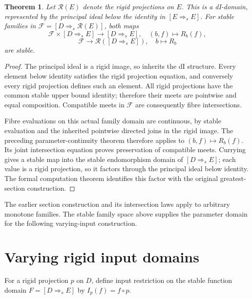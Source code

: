 \documentclass[11pt]{article}
\newtheorem{theorem}{Theorem}[section]
\begin{document}
\begin{theorem}
Let $\mathcal R(E)$ denote the rigid projections on $E$. This is a
dI-domain, represented by the principal ideal below the identity in
$[E\Rightarrow_s E]$. For stable families in
$\mathcal F=[D\Rightarrow_s\mathcal R(E)]$, both maps
\[
 \mathcal F\times[D\Rightarrow_s E]\longrightarrow[D\Rightarrow_s E],
 \quad (b,f)\longmapsto R_b(f),
\]
\[
 \mathcal F\longrightarrow\mathcal R([D\Rightarrow_s E]),
 \quad b\longmapsto R_b
\]
are stable.
\end{theorem}
\begin{proof}
The principal ideal is a rigid image, so inherits the dI structure.
Every element below identity satisfies the rigid projection equation,
and conversely every rigid projection defines such an element.
All rigid projections have the common stable upper bound identity;
therefore their meets are pointwise and equal composition.
Compatible meets in $\mathcal F$ are consequently fibre intersections.

Fibre evaluations on this actual family domain are continuous, by
stable evaluation and the inherited pointwise directed joins in the
rigid image. The preceding parameter-continuity theorem therefore
applies to $(b,f)\mapsto R_b(f)$. Its joint intersection equation proves
preservation of compatible meets. Currying gives a stable map into the
stable endomorphism domain of $[D\Rightarrow_s E]$; each value is a rigid
projection, so it factors through the principal ideal below identity.
The formal computation theorem identifies this factor with the original
greatest-section construction.
\end{proof}

The earlier section construction and its intersection laws apply to
arbitrary monotone families. The stable family space above supplies the
parameter domain for the following varying-input construction.

\section{Varying rigid input domains}

For a rigid projection $p$ on $D$, define input restriction on the stable
function domain $F=[D\Rightarrow_s E]$ by $I_p(f)=f\circ p$.
\end{document}

